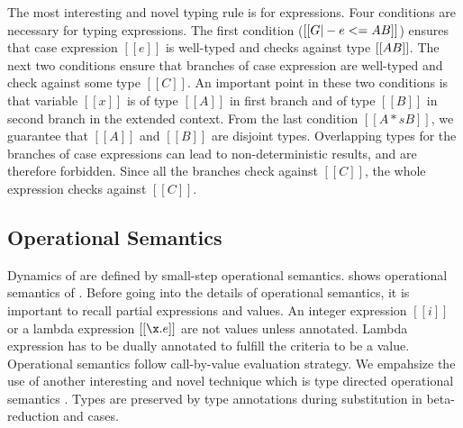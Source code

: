 The most interesting and novel typing rule is for
\typeof expressions. Four conditions are necessary for typing
\typeof expressions.
The first condition ($[[G |-
    e <= A \/ B]]$) ensures that case expression $[[e]]$ is well-typed
and checks against type $[[A \/ B]]$.  The next two conditions ensure that
branches of case expression are well-typed and check against some type
$[[C]]$. An important point in these two conditions is that variable
$[[x]]$ is of type $[[A]]$ in first branch and of type $[[B]]$ in
second branch in the extended context.  From the last condition
$[[A *s B]]$, we guarantee that $[[A]]$ and $[[B]]$ are disjoint
types. Overlapping types for the 
branches of case expressions can lead to non-deterministic 
results, and are therefore forbidden.
Since all the branches check against $[[C]]$, the whole
\typeof expression checks against $[[C]]$.

\begin{comment}
\begin{figure}[t]
  \begin{small}
    \centering
    \drules[typ]{$ [[G |- e dirflag A]] $}{Bidirectional Typing}{int, var, ann, app, sub, abs, typeof}
  \end{small}
  \caption{Typing for \cal.}
  \label{fig:union:typ}
\end{figure}
\end{comment}

\subsection{Operational Semantics}
\label{sec:union:os}
Dynamics of \cal are defined by small-step operational semantics.
 shows operational semantics of \cal. Before going
into the details of operational semantics, it is important to recall
partial expressions and values. An integer expression $[[i]]$ or a
lambda expression $[[\x.e]]$ are not values unless annotated. Lambda
expression has to be dually annotated to fulfill the criteria to be a
value. Operational semantics follow call-by-value evaluation strategy.
We empahsize the use of another interesting and novel technique which
is type directed operational semantics . Types
are preserved by type annotations during substitution in
beta-reduction and \typeof cases.

